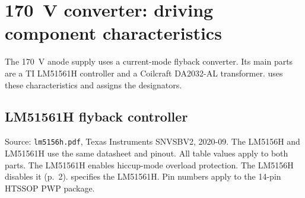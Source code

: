\section{170~V converter: driving component characteristics}
\label{sec:hv-components}

The 170~V anode supply uses a current-mode flyback converter. Its main parts
are a TI LM51561H controller and a Coilcraft DA2032-AL transformer.
 uses these characteristics and assigns the designators.

\subsection{LM51561H flyback controller}
\label{sec:lm5156h}

Source: \texttt{lm5156h.pdf}, Texas Instruments SNVSBV2, 2020-09. The LM5156H
and LM51561H use the same datasheet and pinout. All table values apply to both
parts. The LM51561H enables hiccup-mode overload protection. The LM5156H
disables it (p.~2).  specifies the LM51561H. Pin numbers apply
to the 14-pin HTSSOP PWP package.

